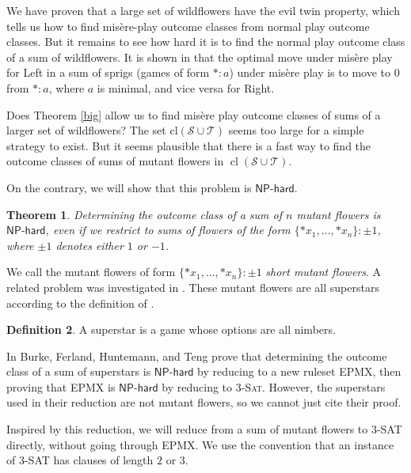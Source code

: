 \documentclass{amsart}
\theoremstyle{plain}
\newtheorem{thm}{Theorem}
\theoremstyle{definition}
\newtheorem{defn}[thm]{Definition}
\theoremstyle{remark}
\numberwithin{equation}{section}
\numberwithin{thm}{section}
\DeclareMathOperator{\cl}{cl}
\begin{document}
We have proven that a large set of wildflowers have the evil twin property, which tells us how to find mis\`ere-play outcome classes from normal play outcome classes. But it remains to see how hard it is to find the normal play outcome class of a sum of wildflowers. It is shown in \cite{mckay2016misere} that the optimal move under mis\`ere play for Left in a sum of sprigs (games of form $*:a$) under mis\`ere play is to move to $0$ from $*:a$, where $a$ is minimal, and vice versa for Right.

Does Theorem \ref{big} allow us to find mis\`ere play outcome classes of sums of a larger set of wildflowers? The set $\text{cl}(\mathscr{S} \cup \mathscr{T})$ seems too large for a simple strategy to exist. But it seems plausible that there is a fast way to find the outcome classes of sums of mutant flowers in $\cl(\mathscr{S} \cup \mathscr{T})$.

On the contrary, we will show that this problem is $\mathsf{NP\text{-}hard}$. 

\begin{thm}
    \label{hard}
    Determining the outcome class of a sum of $n$ mutant flowers is $\mathsf{NP\text{-}hard}$, even if we restrict to sums of flowers of the form $\{*x_1,\dots,*x_n\}:\pm 1$, where $\pm 1$ denotes \emph{either} $1$ or $-1$.
\end{thm}

We call the mutant flowers of form $\{*x_1 ,\dots,*x_n\}: \pm 1$ \emph{short mutant flowers}. A related problem was investigated in \cite{burke2024tractability}. These mutant flowers are all superstars according to the definition of \cite{burke2024tractability}.

\begin{defn}
    A superstar is a game whose options are all nimbers.
\end{defn}

In \cite{burke2024tractability} Burke, Ferland, Huntemann, and Teng prove that determining the outcome class of a sum of superstars is $\mathsf{NP\text{-}hard}$ by reducing to a new ruleset \textsc{EPMX}, then proving that \textsc{EPMX} is $\mathsf{NP\text{-}hard}$ by reducing to \textsc{3-Sat}. However, the superstars used in their reduction are not mutant flowers, so we cannot just cite their proof.

Inspired by this reduction, we will reduce from a sum of mutant flowers to 3\textsc{-SAT} directly, without going through \textsc{EPMX}. We use the convention that an instance of 3\textsc{-SAT} has clauses of length $2$ or $3$.
\end{document}
